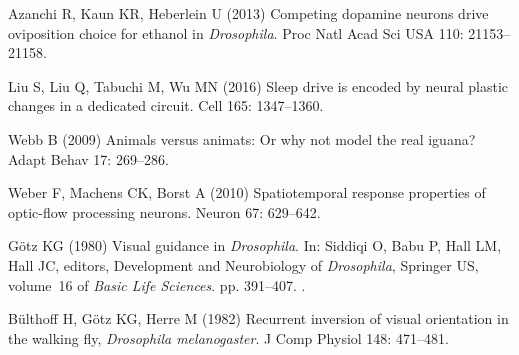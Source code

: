 \begin{thebibliography}{10}
	Azanchi R, Kaun KR, Heberlein U (2013) Competing dopamine neurons drive
	oviposition choice for ethanol in \emph{Drosophila}.
	\newblock Proc Natl Acad Sci USA 110: 21153--21158.
	
	Liu S, Liu Q, Tabuchi M, Wu MN (2016) Sleep drive is encoded by neural plastic
	changes in a dedicated circuit.
	\newblock Cell 165: 1347--1360.
	
	Webb B (2009) Animals versus animats: {O}r why not model the real iguana?
	\newblock Adapt Behav 17: 269--286.
	
	Weber F, Machens CK, Borst A (2010) Spatiotemporal response properties of
	optic-flow processing neurons.
	\newblock Neuron 67: 629--642.
	
	G{\"{o}}tz KG (1980) Visual guidance in \emph{Drosophila}.
	\newblock In: Siddiqi O, Babu P, Hall LM, Hall JC, editors, Development and
	Neurobiology of \emph{Drosophila}, Springer US, volume~16 of \emph{Basic Life
		Sciences}. pp. 391--407.
	\newblock {}.
	
	B\"{u}lthoff H, G\"{o}tz KG, Herre M (1982) Recurrent inversion of visual
	orientation in the walking fly, \emph{Drosophila melanogaster}.
	\newblock J Comp Physiol 148: 471--481.
	
\end{thebibliography}

\newpage
